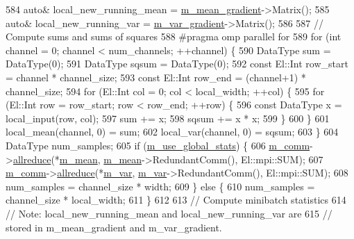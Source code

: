 \begin{DoxyCode}
584       \textcolor{keyword}{auto}& local\_new\_running\_mean = \hyperlink{classlbann_1_1batch__normalization_aa4677c2f7d5ea27c53bf0f61f280a2a3}{m\_mean\_gradient}->Matrix();
585       \textcolor{keyword}{auto}& local\_new\_running\_var = \hyperlink{classlbann_1_1batch__normalization_aa2d2050a265eed854aa8950cd1461af9}{m\_var\_gradient}->Matrix();
586 
587       \textcolor{comment}{// Compute sums and sums of squares}
588 \textcolor{preprocessor}{      #pragma omp parallel for}
589       \textcolor{keywordflow}{for} (\textcolor{keywordtype}{int} channel = 0; channel < num\_channels; ++channel) \{
590         DataType sum = DataType(0);
591         DataType sqsum = DataType(0);
592         \textcolor{keyword}{const} El::Int row\_start = channel * channel\_size;
593         \textcolor{keyword}{const} El::Int row\_end = (channel+1) * channel\_size;
594         \textcolor{keywordflow}{for} (El::Int col = 0; col < local\_width; ++col) \{
595           \textcolor{keywordflow}{for} (El::Int row = row\_start; row < row\_end; ++row) \{
596             \textcolor{keyword}{const} DataType x = local\_input(row, col);
597             sum += x;
598             sqsum += x * x;
599           \}
600         \}
601         local\_mean(channel, 0) = sum;
602         local\_var(channel, 0) = sqsum;
603       \}
604       DataType num\_samples;
605       \textcolor{keywordflow}{if} (\hyperlink{classlbann_1_1batch__normalization_a0a33289150c01899f4b7ef2980771899}{m\_use\_global\_stats}) \{
606         \hyperlink{classlbann_1_1Layer_a5de05c52f22e0bbd7c703bec3ad4dbf2}{m\_comm}->\hyperlink{classlbann_1_1lbann__comm_af5631e5f0f54e4df4958eba9df2599ef}{allreduce}(*\hyperlink{classlbann_1_1batch__normalization_a7c0db2315a4c5bb662da7a740ae76e24}{m\_mean}, \hyperlink{classlbann_1_1batch__normalization_a7c0db2315a4c5bb662da7a740ae76e24}{m\_mean}->RedundantComm(), El::mpi::SUM);
607         \hyperlink{classlbann_1_1Layer_a5de05c52f22e0bbd7c703bec3ad4dbf2}{m\_comm}->\hyperlink{classlbann_1_1lbann__comm_af5631e5f0f54e4df4958eba9df2599ef}{allreduce}(*\hyperlink{classlbann_1_1batch__normalization_aba533149e4179378ab23443b0a2a7dc6}{m\_var}, \hyperlink{classlbann_1_1batch__normalization_aba533149e4179378ab23443b0a2a7dc6}{m\_var}->RedundantComm(), El::mpi::SUM);
608         num\_samples = channel\_size * width;
609       \} \textcolor{keywordflow}{else} \{
610         num\_samples = channel\_size * local\_width;
611       \}
612 
613       \textcolor{comment}{// Compute minibatch statistics}
614       \textcolor{comment}{// Note: local\_new\_running\_mean and local\_new\_running\_var are}
615       \textcolor{comment}{// stored in m\_mean\_gradient and m\_var\_gradient.}

\end{DoxyCode}
